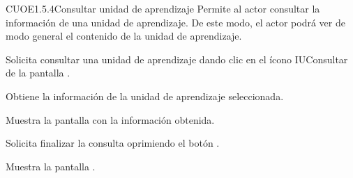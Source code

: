\begin{UseCase}{CUOE1.5.4}{Consultar unidad de aprendizaje}{	
	Permite al actor consultar la información de una unidad de aprendizaje. De este modo, el actor podrá ver de modo general el contenido de la unidad de aprendizaje.
}
{\begin{UClist}
		\end{UClist}
	}
\end{UseCase}

\begin{UCtrayectoria}
	\UCpaso [\UCactor] Solicita consultar una unidad de aprendizaje dando clic en el ícono IUConsultar de la pantalla . 
	
	\UCpaso [\UCsist] Obtiene la información de la unidad de aprendizaje seleccionada.
	
	\UCpaso [\UCsist] Muestra la pantalla  con la información obtenida.
	
	\UCpaso [\UCactor] Solicita finalizar la consulta oprimiendo el botón . 
	
	\UCpaso [\UCsist] Muestra la pantalla .
	
\end{UCtrayectoria}

